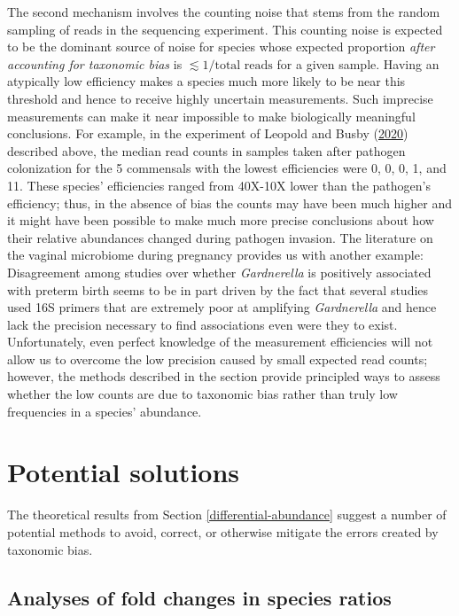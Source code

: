 \documentclass[
]{article}
\begin{document}
The second mechanism involves the counting noise that stems from the random sampling of reads in the sequencing experiment.
This counting noise is expected to be the dominant source of noise for species whose expected proportion \emph{after accounting for taxonomic bias} is \(\lesssim 1 / \text{total reads}\) for a given sample.
Having an atypically low efficiency makes a species much more likely to be near this threshold and hence to receive highly uncertain measurements.
Such imprecise measurements can make it near impossible to make biologically meaningful conclusions.
For example, in the experiment of Leopold and Busby (\protect\hyperlink{ref-leopold2020host}{2020}) described above, the median read counts in samples taken after pathogen colonization for the 5 commensals with the lowest efficiencies were 0, 0, 0, 1, and 11.
These species' efficiencies ranged from 40X-10X lower than the pathogen's efficiency; thus, in the absence of bias the counts may have been much higher and it might have been possible to make much more precise conclusions about how their relative abundances changed during pathogen invasion.
The literature on the vaginal microbiome during pregnancy provides us with another example: Disagreement among studies over whether \emph{Gardnerella} is positively associated with preterm birth seems to be in part driven by the fact that several studies used 16S primers that are extremely poor at amplifying \emph{Gardnerella} and hence lack the precision necessary to find associations even were they to exist.
Unfortunately, even perfect knowledge of the measurement efficiencies will not allow us to overcome the low precision caused by small expected read counts; however, the methods described in the section provide principled ways to assess whether the low counts are due to taxonomic bias rather than truly low frequencies in a species' abundance.

\hypertarget{solutions}{%
\section{Potential solutions}\label{solutions}}

The theoretical results from Section \ref{differential-abundance} suggest a number of potential methods to avoid, correct, or otherwise mitigate the errors created by taxonomic bias.

\hypertarget{analyses-of-fold-changes-in-species-ratios}{%
\subsection{Analyses of fold changes in species ratios}\label{analyses-of-fold-changes-in-species-ratios}}
\end{document}
